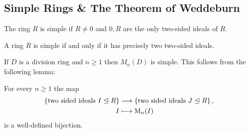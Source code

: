 \subsection{Simple Rings \& The Theorem of Weddeburn}


% 
% 


\begin{definition}
  The ring $R$ is simple if $R \neq 0$ and $0, R$ are the only two-sided ideals of $R$.
\end{definition}


\begin{remark}
  A ring $R$ is simple if and only if it has precisely two two-sided ideals.
\end{remark}


\begin{example}
  If $D$ is a division ring and $n \geq 1$ then $M_n(D)$ is simple.
  This follows from the following lemma:
\end{example}


\begin{lemma}
  For every $n \geq 1$ the map
  \begin{align*}
              \{ \text{two sided ideals $I \trianglelefteq R$} \}
    &\longrightarrow  \{ \text{two sided ideals $J \trianglelefteq R$} \} \,,
    \\
                  I
    &\longmapsto  \operatorname{M}_n(I)
  \end{align*}
  is a well-defined bijection.
\end{lemma}







